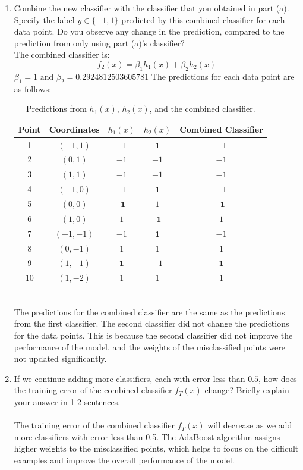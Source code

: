 \documentclass[a3paper,12pt]{extarticle} %
\begin{document}
\begin{enumerate}
\item Combine the new classifier with the classifier that you obtained in part (a). Specify the label $y \in \{-1, 1\}$ predicted by this combined classifier for each data point. Do you observe any change in the prediction, compared to the prediction from only using part (a)'s classifier?
\\ The combined classifier is:
\[
f_2(x) = \beta_1 h_1(x) + \beta_2 h_2(x)
\]
$\beta_1 = 1 \text{ and } \beta_2 = 0.2924812503605781$
The predictions for each data point are as follows:
\begin{table}[h!]
    \centering
    \begin{tabular}{|c|c|c|c|c|}
    \hline
    \textbf{Point} & \textbf{Coordinates} & \textbf{$h_1(x)$} & \textbf{$h_2(x)$} & \textbf{Combined Classifier} \\ \hline
    1 & $(-1, 1)$ & $-1$ & $\textbf{1}$ & $-1$ \\ \hline
    2 & $(0, 1)$ & $-1$ & $-1$ & $-1$ \\ \hline
    3 & $(1, 1)$ & $-1$ & $-1$ & $-1$ \\ \hline
    4 & $(-1, 0)$ & $-1$ & $\textbf{1}$ & $-1$ \\ \hline
    5 & $(0, 0)$ & $\textbf{-1}$ & $1$ & $\textbf{-1}$ \\ \hline
    6 & $(1, 0)$ & $1$ & $\textbf{-1}$ & $1$ \\ \hline
    7 & $(-1, -1)$ & $-1$ & $\textbf{1}$ & $-1$ \\ \hline
    8 & $(0, -1)$ & $1$ & $1$ & $1$ \\ \hline
    9 & $(1, -1)$ & $\textbf{1}$ & $-1$ & $\textbf{1}$ \\ \hline
    10 & $(1, -2)$ & $1$ & $1$ & $1$ \\ \hline
    \end{tabular}
    \caption{Predictions from $h_1(x)$, $h_2(x)$, and the combined classifier.}
    \label{table:combined_classifier}
\end{table}
\\ The predictions for the combined classifier are the same as the predictions from the first classifier. The second classifier did not change the predictions for the data points. This is because the second classifier did not improve the performance of the model, and the weights of the misclassified points were not updated significantly.
\item  If we continue adding more classifiers, each with error less than $0.5$, how does the training error of the combined classifier $f_T(x)$ change? Briefly explain your answer in 1-2 sentences.
\\\\ The training error of the combined classifier $f_T(x)$ will decrease as we add more classifiers with error less than 0.5. The AdaBoost algorithm assigns higher weights to the misclassified points, which helps to focus on the difficult examples and improve the overall performance of the model.
\newpage


\end{enumerate}
\end{document}
